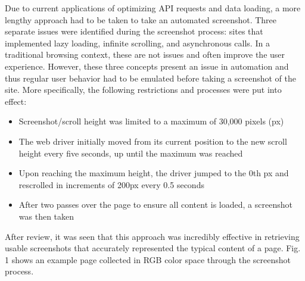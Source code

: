 \documentclass[conference]{IEEEtran}
\begin{document}
Due to current applications of optimizing API requests and data loading, a more lengthy approach had to be taken to take an automated screenshot. Three separate issues were identified during the screenshot process: sites that implemented lazy loading, infinite scrolling, and asynchronous calls. In a traditional browsing context, these are not issues and often improve the user experience. However, these three concepts present an issue in automation and thus regular user behavior had to be emulated before taking a screenshot of the site. More specifically, the following restrictions and processes were put into effect:

\renewcommand{\labelitemi}{$\textendash$}
\begin{itemize}
\item Screenshot/scroll height was limited to a maximum of 30,000 pixels (px)
\item The web driver initially moved from its current position to the new scroll height every five seconds, up until the maximum was reached
\item Upon reaching the maximum height, the driver jumped to the 0th px and rescrolled in increments of 200px every 0.5 seconds
\item After two passes over the page to ensure all content is loaded, a screenshot was then taken
\end{itemize}

After review, it was seen that this approach was incredibly effective in retrieving usable screenshots that accurately represented the typical content of a page. Fig. 1 shows an example page collected in RGB color space through the screenshot process.
\end{document}
